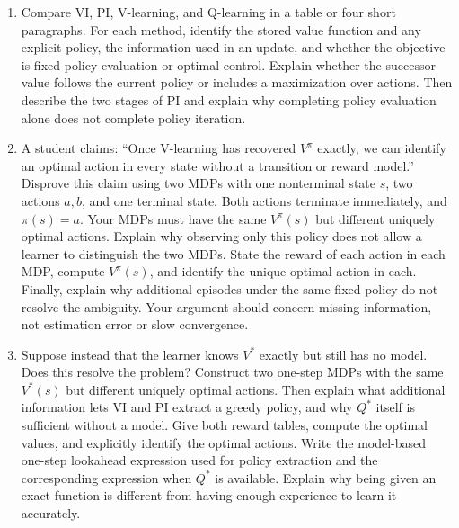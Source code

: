 \documentclass[11pt]{article}
\newenvironment{studentanswer}[1]
  {\par\medskip\noindent
   \begin{tcolorbox}[height from=#1 to 100cm, colback=white, colframe=gray!60,
     boxrule=0.6pt, arc=0pt, outer arc=0pt, left=7pt, right=7pt,
     top=7pt, bottom=7pt, title={Answer / work}, fonttitle=\small,
     coltitle=black, colbacktitle=gray!8, titlerule=0pt]
   \ignorespaces}
  {\end{tcolorbox}\par}
\begin{document}
\begin{enumerate}[label=(\alph*)]
\item Compare VI, PI, V-learning, and Q-learning in a table or four
short paragraphs. For each method, identify the stored value function
and any explicit policy, the information used in an update, and whether
the objective is fixed-policy evaluation or optimal control. Explain
whether the successor value follows the current policy or includes a
maximization over actions. Then describe the two stages of PI and explain
why completing policy evaluation alone does not complete policy iteration.

\begin{studentanswer}{8cm}

\end{studentanswer}

\clearpage
\item A student claims: ``Once V-learning has recovered $V^\pi$ exactly,
we can identify an optimal action in every state without a transition or
reward model.'' Disprove this claim using two MDPs with one nonterminal
state $s$, two actions $a,b$, and one terminal state. Both actions terminate
immediately, and $\pi(s)=a$. Your MDPs must have the same $V^\pi(s)$ but
different uniquely optimal actions. Explain why observing only this policy
does not allow a learner to distinguish the two MDPs. State the reward
of each action in each MDP, compute $V^\pi(s)$, and identify the unique
optimal action in each. Finally, explain why additional episodes under
the same fixed policy do not resolve the ambiguity. Your argument should
concern missing information, not estimation error or slow convergence.

\begin{studentanswer}{5cm}

\end{studentanswer}

\clearpage
\item Suppose instead that the learner knows $V^*$ exactly but still has
no model. Does this resolve the problem? Construct two one-step MDPs with
the same $V^*(s)$ but different uniquely optimal actions. Then explain
what additional information lets VI and PI extract a greedy policy, and
why $Q^*$ itself is sufficient without a model. Give both reward tables,
compute the optimal values, and explicitly identify the optimal actions.
Write the model-based one-step lookahead expression used for policy
extraction and the corresponding expression when $Q^*$ is available.
Explain why being given an exact function is different from having
enough experience to learn it accurately.

\begin{studentanswer}{5cm}

\end{studentanswer}

\end{enumerate}
\end{document}
